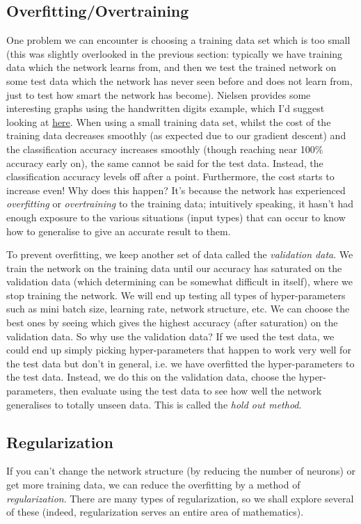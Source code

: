 \documentclass[10pt]{article}
\begin{document}
\subsection{Overfitting/Overtraining}
One problem we can encounter is choosing a training data set which is too small (this was slightly overlooked in the previous section: typically we have training data which the network learns from, and then we test the trained network on some test data which the network has never seen before and does not learn from, just to test how smart the network has become). Nielsen provides some interesting graphs using the handwritten digits example, which I'd suggest looking at \href{http://neuralnetworksanddeeplearning.com/chap3.html}{here}. When using a small training data set, whilst the cost of the training data decreases smoothly (as expected due to our gradient descent) and the classification accuracy increases smoothly (though reaching near 100$\%$ accuracy early on), the same cannot be said for the test data. Instead, the classification accuracy levels off after a point. Furthermore, the cost starts to increase even! Why does this happen? It's because the network has experienced \textit{overfitting} or \textit{overtraining} to the training data; intuitively speaking, it hasn't had enough exposure to the various situations (input types) that can occur to know how to generalise to give an accurate result to them. \par
To prevent overfitting, we keep another set of data called the \textit{validation data}. We train the network on the training data until our accuracy has saturated on the validation data (which determining can be somewhat difficult in itself), where we stop training the network. We will end up testing all types of hyper-parameters such as mini batch size, learning rate, network structure, etc. We can choose the best ones by seeing which gives the highest accuracy (after saturation) on the validation data. So why use the validation data? If we used the test data, we could end up simply picking hyper-parameters that happen to work very well for the test data but don't in general, i.e. we have overfitted the hyper-parameters to the test data. Instead, we do this on the validation data, choose the hyper-parameters, then evaluate using the test data to see how well the network generalises to totally unseen data. This is called the \textit{hold out method}.

\subsection{Regularization}
If you can't change the network structure (by reducing the number of neurons) or get more training data, we can reduce the overfitting by a method of \textit{regularization}. There are many types of regularization, so we shall explore several of these (indeed, regularization serves an entire area of mathematics). 
\end{document}
